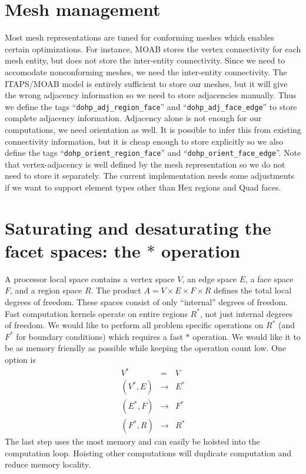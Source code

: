\documentclass[a4paper]{article}
\newcommand{\trl}[1]{\texttt{#1}}
\begin{document}
\section{Mesh management}
Most mesh representations are tuned for conforming meshes which enables certain optimizations.  For instance, MOAB
stores the vertex connectivity for each mesh entity, but does not store the inter-entity connectivity.  Since we need to
accomodate nonconforming meshes, we need the inter-entity connectivity.  The ITAPS/MOAB model is entirely sufficient to
store our meshes, but it will give the wrong adjacency information so we need to store adjacencies manually.  Thus we
define the tags ``\trl{dohp\_adj\_region\_face}'' and ``\trl{dohp\_adj\_face\_edge}'' to store complete adjacency information.
Adjacency alone is not enough for our computations, we need orientation as well.  It is possible to infer this from
existing connectivity information, but it is cheap enough to store explicitly so we also define the tags
``\trl{dohp\_orient\_region\_face}'' and ``\trl{dohp\_orient\_face\_edge}''.  Note that vertex-adjacency is well defined by
the mesh representation so we do not need to store it separately.  The current implementation needs some adjustments if
we want to support element types other than Hex regions and Quad faces.

\section{Saturating and desaturating the facet spaces: the $*$ operation}
A processor local space contains a vertex space $V$, an edge space $E$, a face space $F$, and a region space $R$.  The
product $A = V \times E \times F \times R$ defines the total local degrees of freedom.  These spaces consist of only
``internal'' degrees of freedom.  Fast computation kernels operate on entire regions $R^*$, not just internal degrees of
freedom.  We would like to perform all problem specific operations on $R^*$ (and $F^*$ for boundary conditions) which
requires a fast $*$ operation.  We would like it to be as memory friendly as possible while keeping the operation count
low.  One option is
\begin{eqnarray*}  \label{eq:star}
  V^* &=& V \\
  (V^*,E) &\to& E^* \\
  (E^*,F) &\to& F^* \\
  (F^*,R) &\to& R^*
\end{eqnarray*}
The last step uses the most memory and can easily be hoisted into the computation loop.  Hoisting other computations
will duplicate computation and reduce memory locality.
\end{document}
